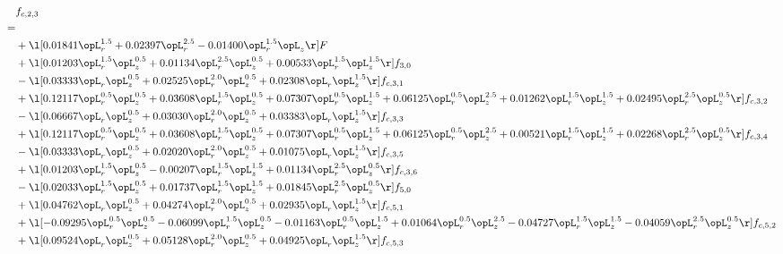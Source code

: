 \begin{alignat}{2} 
\label{eq:f_23_2} 
& f_{c,2,3} \nonumber \\ 
 = \\ 
& + \l[  0.01841 \opL_r^{1.5} +  0.02397 \opL_r^{2.5}   -0.01400 \opL_r^{1.5} \opL_z  \r] F \nonumber \\ 
& + \l[  0.01203 \opL_r^{1.5} \opL_z^{0.5} +  0.01134 \opL_r^{2.5} \opL_z^{0.5} +  0.00533 \opL_r^{1.5} \opL_z^{1.5}  \r] f_{3,0} \nonumber \\ 
& - \l[  0.03333 \opL_r \opL_z^{0.5} +  0.02525 \opL_r^{2.0} \opL_z^{0.5} +  0.02308 \opL_r \opL_z^{1.5}  \r] f_{c,3,1} \nonumber \\ 
& + \l[  0.12117 \opL_r^{0.5} \opL_z^{0.5} +  0.03608 \opL_r^{1.5} \opL_z^{0.5} +  0.07307 \opL_r^{0.5} \opL_z^{1.5} +  0.06125 \opL_r^{0.5} \opL_z^{2.5} +  0.01262 \opL_r^{1.5} \opL_z^{1.5} +  0.02495 \opL_r^{2.5} \opL_z^{0.5}  \r] f_{c,3,2} \nonumber \\ 
& - \l[  0.06667 \opL_r \opL_z^{0.5} +  0.03030 \opL_r^{2.0} \opL_z^{0.5} +  0.03383 \opL_r \opL_z^{1.5}  \r] f_{c,3,3} \nonumber \\ 
& + \l[  0.12117 \opL_r^{0.5} \opL_z^{0.5} +  0.03608 \opL_r^{1.5} \opL_z^{0.5} +  0.07307 \opL_r^{0.5} \opL_z^{1.5} +  0.06125 \opL_r^{0.5} \opL_z^{2.5} +  0.00521 \opL_r^{1.5} \opL_z^{1.5} +  0.02268 \opL_r^{2.5} \opL_z^{0.5}  \r] f_{c,3,4} \nonumber \\ 
& - \l[  0.03333 \opL_r \opL_z^{0.5} +  0.02020 \opL_r^{2.0} \opL_z^{0.5} +  0.01075 \opL_r \opL_z^{1.5}  \r] f_{c,3,5} \nonumber \\ 
& + \l[  0.01203 \opL_r^{1.5} \opL_z^{0.5}   -0.00207 \opL_r^{1.5} \opL_z^{1.5} +  0.01134 \opL_r^{2.5} \opL_z^{0.5}  \r] f_{c,3,6} \nonumber \\ 
& - \l[  0.02033 \opL_r^{1.5} \opL_z^{0.5} +  0.01737 \opL_r^{1.5} \opL_z^{1.5} +  0.01845 \opL_r^{2.5} \opL_z^{0.5}  \r] f_{5,0} \nonumber \\ 
& + \l[  0.04762 \opL_r \opL_z^{0.5} +  0.04274 \opL_r^{2.0} \opL_z^{0.5} +  0.02935 \opL_r \opL_z^{1.5}  \r] f_{c,5,1} \nonumber \\ 
& + \l[  -0.09295 \opL_r^{0.5} \opL_z^{0.5}   -0.06099 \opL_r^{1.5} \opL_z^{0.5}   -0.01163 \opL_r^{0.5} \opL_z^{1.5} +  0.01064 \opL_r^{0.5} \opL_z^{2.5}   -0.04727 \opL_r^{1.5} \opL_z^{1.5}   -0.04059 \opL_r^{2.5} \opL_z^{0.5}  \r] f_{c,5,2} \nonumber \\ 
& + \l[  0.09524 \opL_r \opL_z^{0.5} +  0.05128 \opL_r^{2.0} \opL_z^{0.5} +  0.04925 \opL_r \opL_z^{1.5}  \r] f_{c,5,3} \nonumber \\ 

\end{alignat}
